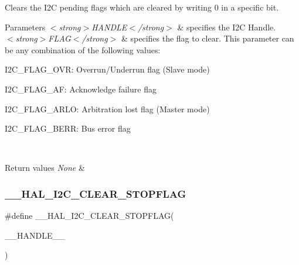 Clears the I2C pending flags which are cleared by writing 0 in a specific bit. 


\begin{DoxyParams}{Parameters}
{\em $<$strong$>$\+H\+A\+N\+D\+L\+E$<$/strong$>$} & specifies the I2C Handle. \\
\hline
{\em $<$strong$>$\+F\+L\+A\+G$<$/strong$>$} & specifies the flag to clear. This parameter can be any combination of the following values\+: \begin{DoxyItemize}
\item I2\+C\+\_\+\+F\+L\+A\+G\+\_\+\+O\+VR\+: Overrun/\+Underrun flag (Slave mode) \item I2\+C\+\_\+\+F\+L\+A\+G\+\_\+\+AF\+: Acknowledge failure flag \item I2\+C\+\_\+\+F\+L\+A\+G\+\_\+\+A\+R\+LO\+: Arbitration lost flag (Master mode) \item I2\+C\+\_\+\+F\+L\+A\+G\+\_\+\+B\+E\+RR\+: Bus error flag \end{DoxyItemize}
\\
\hline
\end{DoxyParams}

\begin{DoxyRetVals}{Return values}
{\em None} & \\
\hline
\end{DoxyRetVals}
\mbox{\label{group___i2_c___exported___macros_gae8e94c16809df16411862b11fea781db}} 
\subsubsection{\texorpdfstring{\+\_\+\+\_\+\+H\+A\+L\+\_\+\+I2\+C\+\_\+\+C\+L\+E\+A\+R\+\_\+\+S\+T\+O\+P\+F\+L\+AG}{\_\_HAL\_I2C\_CLEAR\_STOPFLAG}}
{\footnotesize\ttfamily \#define \+\_\+\+\_\+\+H\+A\+L\+\_\+\+I2\+C\+\_\+\+C\+L\+E\+A\+R\+\_\+\+S\+T\+O\+P\+F\+L\+AG(\begin{DoxyParamCaption}\item[{}]{\+\_\+\+\_\+\+H\+A\+N\+D\+L\+E\+\_\+\+\_\+ }\end{DoxyParamCaption})}

